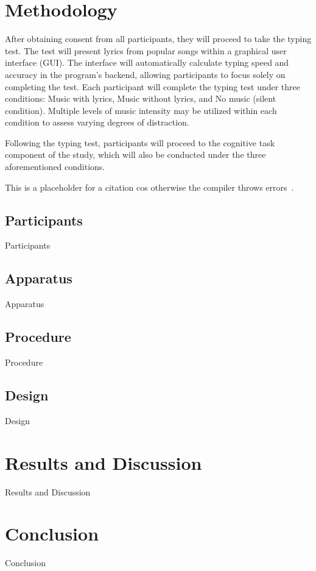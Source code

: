 \documentclass[manuscript, screen, review]{acmart} %
\begin{document}
\section{Methodology}
After obtaining consent from all participants, they will proceed to take the typing test. The test will present lyrics from popular songs within a graphical user interface (GUI). The interface will automatically calculate typing speed and accuracy in the program's backend, allowing participants to focus solely on completing the test. Each participant will complete the typing test under three conditions: Music with lyrics, Music without lyrics, and No music (silent condition).
Multiple levels of music intensity may be utilized within each condition to assess varying degrees of distraction.

Following the typing test, participants will proceed to the cognitive task component of the study, which will also be conducted under the three aforementioned conditions. %

This is a placeholder for a citation cos otherwise the compiler throws errors~\cite{AudioDistractionsAshley}.

\subsection[short]{Participants}
Participants

\subsection[short]{Apparatus}
Apparatus

\subsection[short]{Procedure}
Procedure

\subsection[short]{Design}
Design

\section{Results and Discussion}
Results and Discussion

\section{Conclusion}
Conclusion




\end{document}
